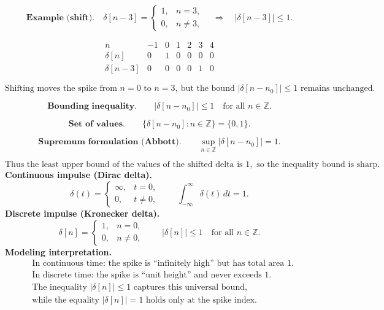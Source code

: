 \documentclass[12pt,a4paper]{article}
\begin{document}
	$$
	\textbf{Example (shift).}\quad
	\delta[n-3]=
	\begin{cases}
		1, & n=3,\\
		0, & n\neq 3,
	\end{cases}
	\quad \Rightarrow \quad
	|\delta[n-3]| \leq 1.
	$$
	
	\[
	\begin{array}{c|cccccc}
		n & -1 & 0 & 1 & 2 & 3 & 4 \\ \hline
		\delta[n]     & 0 & 1 & 0 & 0 & 0 & 0 \\
		\delta[n-3]   & 0 & 0 & 0 & 0 & 1 & 0
	\end{array}
	\]
	
	$$
	\text{Shifting moves the spike from }n=0\text{ to }n=3,\ 
	\text{but the bound }|\delta[n-n_0]| \leq 1\text{ remains unchanged.}
	$$
	
	$$
	\textbf{Bounding inequality.}\qquad
	|\delta[n-n_0]| \leq 1 
	\quad \text{for all } n \in \mathbb{Z}.
	$$
	
	$$
	\textbf{Set of values.}\qquad
	\{\delta[n-n_0] : n \in \mathbb{Z}\} = \{0,1\}.
	$$
	
	$$
	\textbf{Supremum formulation (Abbott).}\qquad
	\sup_{n \in \mathbb{Z}} |\delta[n-n_0]| = 1.
	$$
	
	$$
	\text{Thus the least upper bound of the values of the shifted delta is }1,
	\text{ so the inequality bound is sharp.}
	$$
	\textbf{Continuous impulse (Dirac delta).}\qquad
	$$
	\delta(t) =
	\begin{cases}
		\infty, & t=0, \\
		0, & t \neq 0,
	\end{cases}
	\qquad
	\int_{-\infty}^{\infty} \delta(t)\,dt = 1.
	$$
\textbf{Discrete impulse (Kronecker delta).}\qquad	
	$$
	\delta[n] =
	\begin{cases}
		1, & n=0, \\
		0, & n \neq 0,
	\end{cases}
	\qquad
	|\delta[n]| \leq 1 \quad \text{for all } n\in\mathbb{Z}.
	$$
	\textbf{Modeling interpretation.}\qquad
	$$
	\begin{aligned}
		&\text{In continuous time: the spike is ``infinitely high'' but has total area }1. \\
		&\text{In discrete time: the spike is ``unit height'' and never exceeds }1. \\
		&\text{The inequality }|\delta[n]| \leq 1\text{ captures this universal bound,} \\
		&\text{while the equality }|\delta[n]|=1\text{ holds only at the spike index.}
	\end{aligned}
	$$
	
\end{document}
